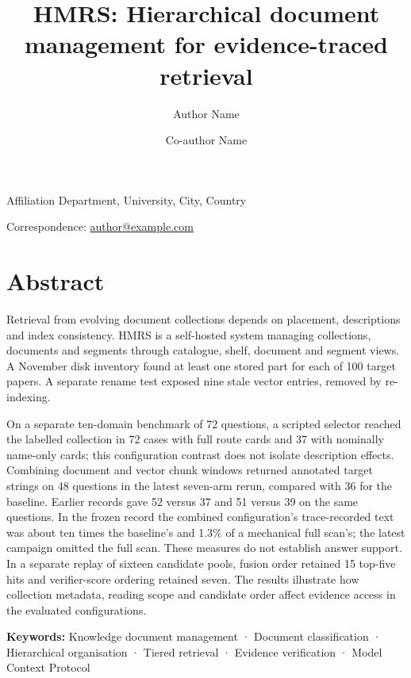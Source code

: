 \title{HMRS: Hierarchical document management for evidence-traced retrieval}
\author{Author Name\and Co-author Name}


\maketitle
\begin{center}Affiliation Department, University,
City, Country\end{center}
\begin{center}Correspondence: \href{mailto:author@example.com}{author@example.com}\end{center}

\section*{Abstract}

Retrieval from evolving document collections depends on placement,
descriptions and index consistency. HMRS is a self-hosted system managing
collections, documents and segments through catalogue, shelf, document and
segment views. A November disk inventory found at least one stored part for
each of 100 target papers. A separate rename test exposed nine stale vector
entries, removed by re-indexing.

On a separate ten-domain benchmark of 72 questions, a scripted selector reached
the labelled collection in 72 cases with full route cards and 37 with nominally
name-only cards; this configuration contrast does not isolate description effects.
Combining document and vector chunk windows returned annotated target strings
on 48 questions in the latest seven-arm rerun, compared with 36 for the
baseline. Earlier records gave 52 versus 37 and 51 versus 39 on the same
questions. In the frozen record the combined configuration's trace-recorded
text was about ten times the baseline's and 1.3\% of a mechanical full scan's;
the latest campaign omitted the full scan. These measures do not establish
answer support. In a separate replay of sixteen candidate pools, fusion order
retained 15 top-five hits and verifier-score ordering retained seven. The
results illustrate how collection metadata, reading scope and candidate order
affect evidence access in the evaluated configurations.

\noindent\textbf{Keywords:} Knowledge document management · Document classification · Hierarchical organisation · Tiered retrieval · Evidence verification · Model Context Protocol

